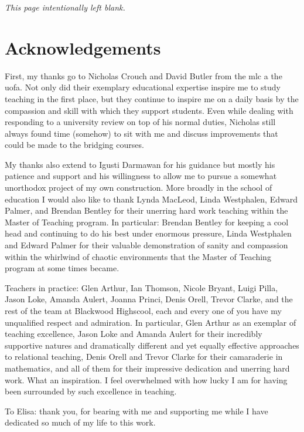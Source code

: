 \documentclass[twoside,12pt,a4paper]{report}
\makeatletter
\newcommand*{\intentionallyblankpage}{
  \vspace*{\fill}
  {\centering \textit{This page intentionally left blank.} \par}
  \vspace{\fill}}
\renewcommand*{\cleardoublepage}{\clearpage\if@twoside \ifodd\c@page\else
  \intentionallyblankpage
  \newpage
  \if@twocolumn\hbox{}\newpage\fi\fi\fi}
\makeatother
\begin{document}
\cleardoublepage
\chapter*{Acknowledgements}

First, my thanks go to Nicholas Crouch and David Butler from the \gls{mlc} a the \gls{uofa}. Not only did their exemplary educational expertise inspire me to study teaching in the first place, but they continue to inspire me on a daily basis by the compassion and skill with which they support students. Even while dealing with responding to a university review on top of his normal duties, Nicholas still always found time (somehow) to sit with me and discuss improvements that could be made to the bridging courses. 

My thanks also extend to Igusti Darmawan for his guidance but mostly his patience and support and his willingness to allow me to pursue a somewhat unorthodox project of my own construction. More broadly in the school of education I would also like to thank Lynda MacLeod, Linda Westphalen, Edward Palmer, and Brendan Bentley for their unerring hard work teaching within the Master of Teaching program. In particular: Brendan Bentley for keeping a cool head and continuing to do his best under enormous pressure, Linda Westphalen and Edward Palmer for their valuable demonstration of sanity and compassion within the whirlwind of chaotic environments that the Master of Teaching program at some times became. 

Teachers in practice: Glen Arthur, Ian Thomson, Nicole Bryant, Luigi Pilla, Jason Loke, Amanda Aulert, Joanna Princi, Denis Orell, Trevor Clarke, and the rest of the team at Blackwood Highscool, each and every one of you have my unqualified respect and admiration. In particular, Glen Arthur as an exemplar of teaching excellence, Jason Loke and Amanda Aulert for their incredibly supportive natures and dramatically different and yet equally effective approaches to relational teaching, Denis Orell and Trevor Clarke for their camaraderie in mathematics, and all of them for their impressive dedication and unerring hard work. What an inspiration. I feel overwhelmed with how lucky I am for having been surrounded by such excellence in teaching.

To Elisa: thank you, for bearing with me and supporting me while I have dedicated so much of my life to this work.
\end{document}
